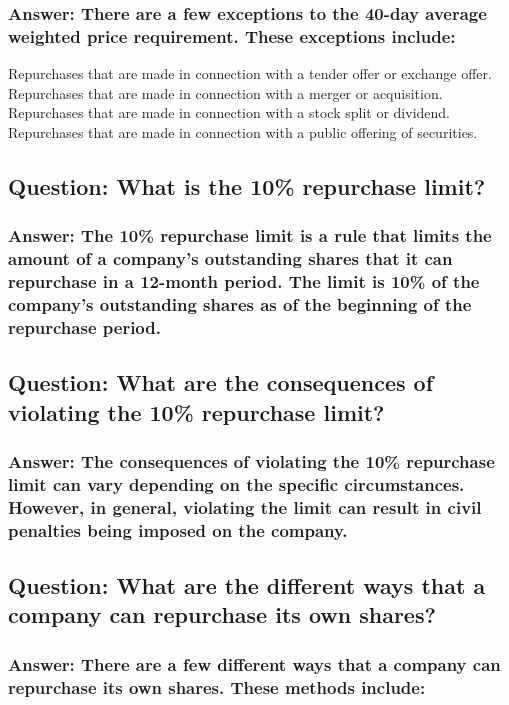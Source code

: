 \documentclass[11pt]{article}
\begin{document}
\subsubsection{Answer: There are a few exceptions to the 40-day average weighted price requirement. These exceptions include:}
\label{sec:orgae9b3c0}

Repurchases that are made in connection with a tender offer or exchange offer.
Repurchases that are made in connection with a merger or acquisition.
Repurchases that are made in connection with a stock split or dividend.
Repurchases that are made in connection with a public offering of securities.
\subsection{Question: What is the 10\% repurchase limit?}
\label{sec:orgd967ec2}

\subsubsection{Answer: The 10\% repurchase limit is a rule that limits the amount of a company's outstanding shares that it can repurchase in a 12-month period. The limit is 10\% of the company's outstanding shares as of the beginning of the repurchase period.}
\label{sec:org88d231d}

\subsection{Question: What are the consequences of violating the 10\% repurchase limit?}
\label{sec:org91c032b}

\subsubsection{Answer: The consequences of violating the 10\% repurchase limit can vary depending on the specific circumstances. However, in general, violating the limit can result in civil penalties being imposed on the company.}
\label{sec:org26b79d8}

\subsection{Question: What are the different ways that a company can repurchase its own shares?}
\label{sec:orgd734104}

\subsubsection{Answer: There are a few different ways that a company can repurchase its own shares. These methods include:}
\label{sec:orgbaf8357}
\end{document}
